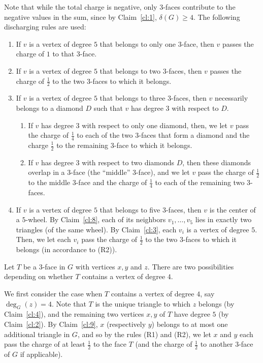 \documentclass[11pt]{article}
\begin{document}
Note that while the total charge is negative, only $3$-faces contribute to the negative values in the sum, since by Claim~\ref{cl:1}, $\delta(G)\ge 4$. 
The following discharging rules are used:
\begin{enumerate}[(R1)]
\item If $v$ is a vertex of degree $5$ that belongs to only one $3$-face, then $v$ passes the charge of ${1}$ to that $3$-face. 

\item If $v$ is a vertex of degree $5$ that belongs to two $3$-faces, then $v$ passes the charge of $\frac{1}{2}$ to the two $3$-faces to which it belongs. 

\item If $v$ is a vertex of degree $5$ that belongs to three $3$-faces, then $v$ necessarily belongs to a diamond $D$ such that $v$ has degree $3$ with respect to $D$. 
\begin{enumerate}[(R3.1)]
\item
If $v$ has degree $3$ with respect to only one diamond, then, we let $v$ pass the charge of $\frac{1}{4}$ to each of the two $3$-faces that form a diamond and the charge $\frac{1}{2}$ to the remaining $3$-face to which it belongs. 
\item 
If $v$ has degree $3$ with respect to two diamonds $D$, then these diamonds overlap in a $3$-face (the ``middle'' $3$-face), and we let $v$ pass the charge of $\frac{1}{2}$ to the middle $3$-face and the charge of $\frac{1}{4}$ to each of the remaining two $3$-faces. 
\end{enumerate}
\item If $v$ is a vertex of degree $5$ that belongs to five $3$-faces, then $v$ is the center of a $5$-wheel. 
By Claim~\ref{cl:8}, each of its neighbors $v_1,\ldots, v_5$ lies in exactly two triangles (of the same wheel). By Claim~\ref{cl:3}, each $v_i$ is a vertex of degree $5$. Then, we let each $v_i$ pass the charge of $\frac{1}{2}$ to the two $3$-faces to which it belongs (in accordance to (R2)).  
\end{enumerate}

Let $T$ be a $3$-face in $G$ with vertices $x,y$ and $z$. There are two possibilities depending on whether $T$ contains a vertex of degree $4$. 

We first consider the case when $T$ contains a vertex of degree $4$, say $\deg_G(z)=4$. Note that $T$ is the unique triangle to which $z$ belongs (by Claim~\ref{cl:4}), and the remaining two vertices $x,y$ of $T$ have degree $5$ (by Claim~\ref{cl:2}). By Claim~\ref{cl:9}, $x$ (respectively $y$) belongs to at most one additional triangle in $G$, and so by the rules (R1) and (R2), we let $x$ and $y$ each pass the charge of at least $\frac{1}{2}$ to the face $T$ (and the charge of $\frac{1}{2}$ to another $3$-face of $G$ if applicable). 
\end{document}
